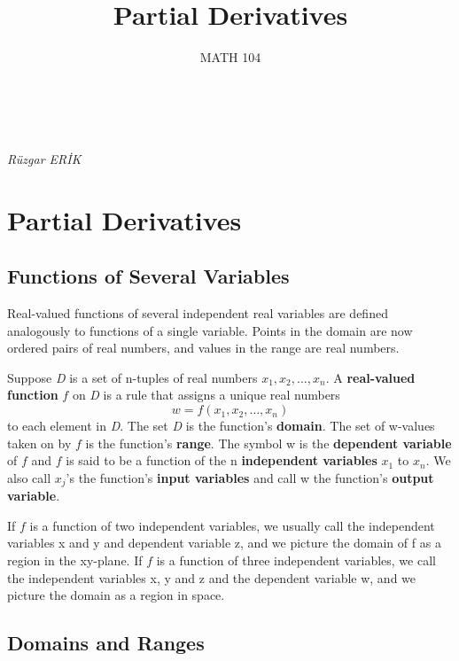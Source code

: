\documentclass[12pt,a4paper,draft]{article}
\makeatletter
\newenvironment{definition}{\begin{definitionbox}}{\end{definitionbox}\vspace{1\baselineskip}}
\renewcommand{\maketitle}{%
  \thispagestyle{firstpage} %
  \begin{tcolorbox}[colback=white,colframe=black,width=\textwidth,arc=0mm,auto outer arc]
    \begin{center}
      \Large \@title \\[1ex] \large \@date \\ \textit{Rüzgar ERİK}
    \end{center}
  \end{tcolorbox}
}
\makeatother
\begin{document}
\title{Partial Derivatives}
\date{MATH 104}
\maketitle
\tableofcontents %

\newpage %

\section{Partial Derivatives}
\subsection{Functions of Several Variables}

Real-valued functions of several independent real variables are defined analogously to functions of a single variable. Points in the domain are now ordered pairs of real numbers, and values in the range are real numbers.

\begin{definition}
    Suppose \textit{D} is a set of n-tuples of real numbers \(x_1, x_2, \dots, x_n\).
    A \textbf{real-valued function} \(f\) on \textit{D} is a rule that assigns a unique real numbers
    \[w = f(x_1, x_2, \dots, x_n)\]
    to each element in \textit{D}. The set \textit{D} is the function's \textbf{domain}. The set of w-values taken on by \(f\) is the function's \textbf{range}. The symbol w is the \textbf{dependent variable} of \(f\) and \(f\) is said to be a function of the n \textbf{independent variables} \(x_1\) to \(x_n\).
    We also call \(x_j\)'s the function's \textbf{input variables} and call w the function's \textbf{output variable}.

\end{definition}


\noindent If \(f\) is a function of two independent variables, we usually call the independent variables x and y and dependent variable z, and we picture the domain of f as a region in the xy-plane.
If \(f\) is a function of three independent variables, we call the independent variables x, y and z and the dependent variable w, and we picture the domain as a region in space.




\subsection{Domains and Ranges}
\end{document}
